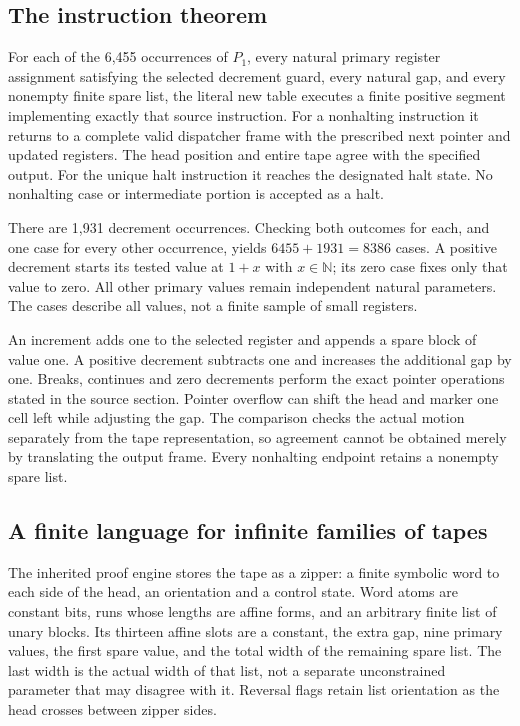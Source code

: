 \subsection{The instruction theorem}

\begin{proposition}
\label{prop:runtime}
For each of the 6,455 occurrences of $P_1$, every natural primary register
assignment satisfying the selected decrement guard, every natural gap,
and every nonempty finite spare list, the literal new table executes a
finite positive segment implementing exactly that source instruction.
For a nonhalting instruction it returns to a complete valid dispatcher
frame with the prescribed next pointer and updated registers. The head
position and entire tape agree with the specified output. For the unique
halt instruction it reaches the designated halt state. No nonhalting
case or intermediate portion is accepted as a halt.
\end{proposition}

There are 1,931 decrement occurrences. Checking both outcomes for each,
and one case for every other occurrence, yields $6455+1931=8386$ cases.
A positive decrement starts its tested value at $1+x$ with $x\in\mathbb N$;
its zero case fixes only that value to zero. All other primary values
remain independent natural parameters. The cases describe all values,
not a finite sample of small registers.

An increment adds one to the selected register and appends a spare block
of value one. A positive decrement subtracts one and increases the
additional gap by one. Breaks, continues and zero decrements perform
the exact pointer operations stated in the source section. Pointer
overflow can shift the head and marker one cell left while adjusting the
gap. The comparison checks the actual motion separately from the tape
representation, so agreement cannot be obtained merely by translating
the output frame. Every nonhalting endpoint retains a nonempty spare
list.

\subsection{A finite language for infinite families of tapes}

The inherited proof engine stores the tape as a zipper: a finite symbolic
word to each side of the head, an orientation and a control state. Word
atoms are constant bits, runs whose lengths are affine forms, and an
arbitrary finite list of unary blocks. Its thirteen affine slots are a
constant, the extra gap, nine primary values, the first spare value,
and the total width of the remaining spare list. The last width is the
actual width of that list, not a separate unconstrained parameter that
may disagree with it. Reversal flags retain list orientation as the head
crosses between zipper sides.

